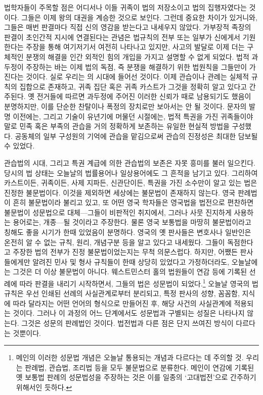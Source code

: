 법학자들이 주목할 점은
어디서나 이들 귀족이 법의 저장소이고 법의 집행자였다는 것이다.
그들은 이제 왕의 대권을 계승한 것으로 보인다.
그런데 중요한 차이가 있거니와,
그들은 매번 판결마다 직접 신의 영감을 받는다고 내세우지 않았다.
가부장적 족장의 판결이 초인간적 지시에 연결된다는 관념은
법규칙의 전부 또는 일부가 신에게서 기원한다는 주장을 통해 여기저기서 여전히
나타나고 있지만,
사고의 발달로 이제 더는 구체적인 분쟁의 해결을
인간 외적인 힘의 개입을 가지고 설명할 수 없게 되었다.
법적 과두정이 주장하는 바는 이제 법의 독점, 즉
분쟁을 해결하기 위한 법원칙을 그들만이 가진다는 것이다.
실로 우리는 의 시대에 들어선 것이다.
이제 관습이나 관례는 실체적 규칙의 집합으로 존재하고,
귀족 집단 혹은 귀족 카스트가 그것을 정확히 알고 있다고 간주된다.
옛 전거들에 따르면 과두정에 주어진 이러한 신뢰가
때로 남용되기도 했음이 분명하지만,
이를 단순한 찬탈이나 폭정의 장치로만 보아서는 안 될 것이다.
문자의 발명 이전에는, 그리고 기술이 유년기에 머물던 시절에는,
법적 특권을 가진 귀족들이야말로 민족 혹은 부족의 관습을
거의 정확하게 보존하는 유일한 현실적 방법을 구성했다.
공동체의 일부 구성원의 기억에 관습을 맡김으로써
관습의 진정성은 최대한 담보될 수 있었다.

관습법의 시대, 그리고 특권 계급에 의한 관습법의 보존은
자못 흥미를 불러 일으킨다.
당시의 법 상태는 오늘날의 법률용어나 일상용어에도 그 흔적을 남기고 있다.
그리하여
카스트이든, 귀족이든, 사제 지파든, 신관단이든,
특권을 가진 소수만이 알고 있는 법은 진정한 불문법이다.
이것을 제외하면 세상에는 불문법이 존재하지 않는다.
영국 판례법이 흔히 불문법이라 불리고 있고, 또 어떤 영국 학자들은
영국법을 법전으로 편찬하면 불문법이 성문법으로
대체---그들이 비판적인 취지에서, 그러나 사뭇 진지하게 사용하는 용어로는,
개종---될 것이라고 주장한다.
물론 영국 보통법을 마땅히 불문법이라고 칭해도 좋을 시기가 한때 있었음이
분명하다.
영국의 옛 판사들은 변호사나 일반인은 온전히 알 수 없는
규칙, 원리, 개념구분 등을 알고 있다고 내세웠다.
그들이 독점한다고 주장한 법의 전부가 진정 불문법이었는지는 무척 의문스럽다.
하지만, 어쨌든 판사들에게만 알려진 민사 및 형사 규칙들이 한때 상당히 있었다고
가정하더라도, 오늘날에는 그것은 더 이상 불문법이 아니다.
웨스트민스터 홀의 법원들이
연감 등에 기록된 선례에 따라 판결을 내리기 시작하면서,
그들의 법은 성문법이 되었다.\footnote{메인의 이러한 성문법 개념은
  오늘날 통용되는 개념과 다르다는 데 주의할 것. 우리는 판례법, 관습법,
  조리법 등을 모두 불문법으로 분류한다.
  메인이 연감에 기록된 옛 보통법 판례의 성문법성을 주장하는 것은
  이를 일종의 `고대법전'으로 간주하기 위해서인 듯하다.}
오늘날 영국의 법규칙은 우선 인쇄된 선례의 사실관계로부터 분리되고,
특정 판사의 성향, 꼼꼼함, 지식에 따라 달라지는 어떤 언어의 형식으로 만들어진 후,
해당 사건의 사실관계에 적용되는 것이다.
그러나 이 과정의 어느 단계에서도 성문법과 구별되는 성질은 나타나지 않는다.
그것은 성문의 판례법인 것이다.
법전법과 다른 점은 단지 쓰여진 방식이 다르다는 것뿐이다.

